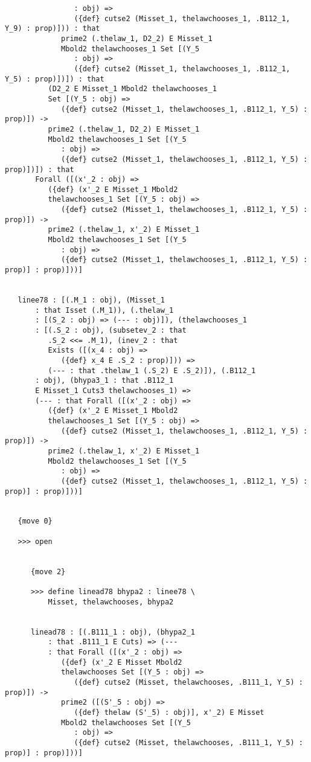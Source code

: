 \documentclass[12pt]{article}
\begin{document}
\begin{verbatim}
                : obj) => 
                ({def} cutse2 (Misset_1, thelawchooses_1, .B112_1, Y_9) : prop)])) : that 
             prime2 (.thelaw_1, D2_2) E Misset_1 
             Mbold2 thelawchooses_1 Set [(Y_5 
                : obj) => 
                ({def} cutse2 (Misset_1, thelawchooses_1, .B112_1, Y_5) : prop)])]) : that 
          (D2_2 E Misset_1 Mbold2 thelawchooses_1 
          Set [(Y_5 : obj) => 
             ({def} cutse2 (Misset_1, thelawchooses_1, .B112_1, Y_5) : prop)]) -> 
          prime2 (.thelaw_1, D2_2) E Misset_1 
          Mbold2 thelawchooses_1 Set [(Y_5 
             : obj) => 
             ({def} cutse2 (Misset_1, thelawchooses_1, .B112_1, Y_5) : prop)])]) : that 
       Forall ([(x'_2 : obj) => 
          ({def} (x'_2 E Misset_1 Mbold2 
          thelawchooses_1 Set [(Y_5 : obj) => 
             ({def} cutse2 (Misset_1, thelawchooses_1, .B112_1, Y_5) : prop)]) -> 
          prime2 (.thelaw_1, x'_2) E Misset_1 
          Mbold2 thelawchooses_1 Set [(Y_5 
             : obj) => 
             ({def} cutse2 (Misset_1, thelawchooses_1, .B112_1, Y_5) : prop)] : prop)]))]


   linee78 : [(.M_1 : obj), (Misset_1 
       : that Isset (.M_1)), (.thelaw_1 
       : [(S_2 : obj) => (--- : obj)]), (thelawchooses_1 
       : [(.S_2 : obj), (subsetev_2 : that 
          .S_2 <<= .M_1), (inev_2 : that 
          Exists ([(x_4 : obj) => 
             ({def} x_4 E .S_2 : prop)])) => 
          (--- : that .thelaw_1 (.S_2) E .S_2)]), (.B112_1 
       : obj), (bhypa3_1 : that .B112_1 
       E Misset_1 Cuts3 thelawchooses_1) => 
       (--- : that Forall ([(x'_2 : obj) => 
          ({def} (x'_2 E Misset_1 Mbold2 
          thelawchooses_1 Set [(Y_5 : obj) => 
             ({def} cutse2 (Misset_1, thelawchooses_1, .B112_1, Y_5) : prop)]) -> 
          prime2 (.thelaw_1, x'_2) E Misset_1 
          Mbold2 thelawchooses_1 Set [(Y_5 
             : obj) => 
             ({def} cutse2 (Misset_1, thelawchooses_1, .B112_1, Y_5) : prop)] : prop)]))]


   {move 0}

   >>> open


      {move 2}

      >>> define linead78 bhypa2 : linee78 \
          Misset, thelawchooses, bhypa2


      linead78 : [(.B111_1 : obj), (bhypa2_1 
          : that .B111_1 E Cuts) => (--- 
          : that Forall ([(x'_2 : obj) => 
             ({def} (x'_2 E Misset Mbold2 
             thelawchooses Set [(Y_5 : obj) => 
                ({def} cutse2 (Misset, thelawchooses, .B111_1, Y_5) : prop)]) -> 
             prime2 ([(S'_5 : obj) => 
                ({def} thelaw (S'_5) : obj)], x'_2) E Misset 
             Mbold2 thelawchooses Set [(Y_5 
                : obj) => 
                ({def} cutse2 (Misset, thelawchooses, .B111_1, Y_5) : prop)] : prop)]))]



\end{verbatim}
\end{document}
